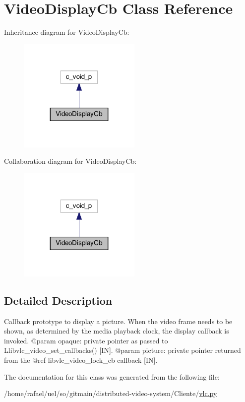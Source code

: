 \hypertarget{classvlc_1_1_video_display_cb}{}\section{Video\+Display\+Cb Class Reference}
\label{classvlc_1_1_video_display_cb}


Inheritance diagram for Video\+Display\+Cb\+:
\nopagebreak
\begin{figure}[H]
\begin{center}
\leavevmode
\includegraphics[width=167pt]{classvlc_1_1_video_display_cb__inherit__graph}
\end{center}
\end{figure}


Collaboration diagram for Video\+Display\+Cb\+:
\nopagebreak
\begin{figure}[H]
\begin{center}
\leavevmode
\includegraphics[width=167pt]{classvlc_1_1_video_display_cb__coll__graph}
\end{center}
\end{figure}


\subsection{Detailed Description}
\begin{DoxyVerb}Callback prototype to display a picture.
When the video frame needs to be shown, as determined by the media playback
clock, the display callback is invoked.
@param opaque: private pointer as passed to L{libvlc_video_set_callbacks}() [IN].
@param picture: private pointer returned from the @ref libvlc_video_lock_cb callback [IN].
\end{DoxyVerb}
 

The documentation for this class was generated from the following file\+:\begin{DoxyCompactItemize}
\item 
/home/rafael/uel/so/gitmain/distributed-\/video-\/system/\+Cliente/\hyperlink{vlc_8py}{vlc.\+py}\end{DoxyCompactItemize}
